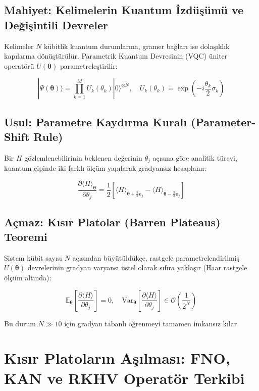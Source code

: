 \documentclass[11pt, a4paper]{article}
\begin{document}
\subsection{Mahiyet: Kelimelerin Kuantum İzdüşümü ve Değişintili Devreler}
Kelimeler $N$ kübitlik kuantum durumlarına, gramer bağları ise dolaşıklık kapılarına dönüştürülür. Parametrik Kuantum Devresinin (VQC) üniter operatörü $U(\bm{\theta})$ parametreleştirilir:

\begin{equation}
|\Psi(\bm{\theta})\rangle = \prod_{k=1}^M U_k(\theta_k) |0\rangle^{\otimes N}, \quad U_k(\theta_k) = \exp\left(-i \frac{\theta_k}{2} \sigma_k\right)
\end{equation}

\subsection{Usul: Parametre Kaydırma Kuralı (Parameter-Shift Rule)}
Bir $H$ gözlemlenebilirinin beklenen değerinin $\theta_j$ açısına göre analitik türevi, kuantum çipinde iki farklı ölçüm yapılarak gradyansız hesaplanır:

\begin{equation}
\frac{\partial \langle H \rangle_{\bm{\theta}}}{\partial \theta_j} = \frac{1}{2} \left[ \langle H \rangle_{\bm{\theta} + \frac{\pi}{2} \mathbf{e}_j} - \langle H \rangle_{\bm{\theta} - \frac{\pi}{2} \mathbf{e}_j} \right]
\end{equation}

\subsection{Açmaz: Kısır Platolar (Barren Plateaus) Teoremi}
Sistem kübit sayısı $N$ açısından büyütüldükçe, rastgele parametrelendirilmiş $U(\bm{\theta})$ devrelerinin gradyan varyansı üstel olarak sıfıra yaklaşır (Haar rastgele ölçüm altında):

\begin{equation}
\mathbb{E}_{\bm{\theta}} \left[ \frac{\partial \langle H \rangle}{\partial \theta_j} \right] = 0, \quad \text{Var}_{\bm{\theta}} \left[ \frac{\partial \langle H \rangle}{\partial \theta_j} \right] \in \mathcal{O}\left( \frac{1}{2^N} \right)
\end{equation}

Bu durum $N \gg 10$ için gradyan tabanlı öğrenmeyi tamamen imkansız kılar.

\section{Kısır Platoların Aşılması: FNO, KAN ve RKHV Operatör Terkibi}
\end{document}
